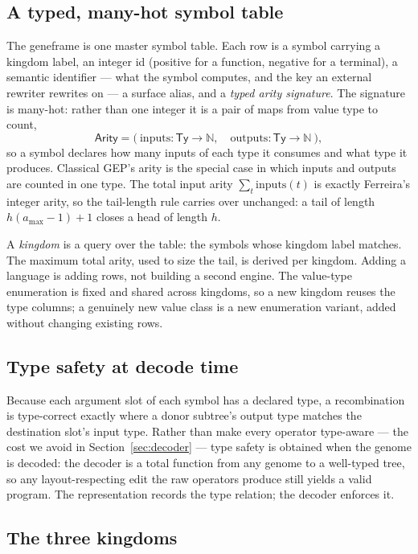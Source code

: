 \documentclass[sigconf,nonacm]{acmart}
\newcommand{\ty}[1]{\textsf{#1}}
\begin{document}
\subsection{A typed, many-hot symbol table}

The geneframe is one master symbol table. Each row is a symbol carrying a
kingdom label, an integer id (positive for a function, negative for a terminal),
a semantic identifier --- what the symbol computes, and the key an external
rewriter rewrites on --- a surface alias, and a \emph{typed arity signature}. The
signature is many-hot: rather than one integer it is a pair of maps from value
type to count,
\[
\ty{Arity} = \big(\ \mathrm{inputs}: \mathsf{Ty}\to\mathbb{N},\quad
\mathrm{outputs}: \mathsf{Ty}\to\mathbb{N}\ \big),
\]
so a symbol declares how many inputs of each type it consumes and what type it
produces. Classical GEP's arity is the special case in which inputs and outputs
are counted in one type. The total input arity $\sum_t \mathrm{inputs}(t)$ is
exactly Ferreira's integer arity, so the tail-length rule carries over
unchanged: a tail of length $h(a_{\max}-1)+1$ closes a head of length $h$.

A \emph{kingdom} is a query over the table: the symbols whose kingdom label
matches. The maximum total arity, used to size the tail, is derived per kingdom.
Adding a language is adding rows, not building a second engine. The value-type
enumeration is fixed and shared across kingdoms, so a new kingdom reuses the type
columns; a genuinely new value class is a new enumeration variant, added without
changing existing rows.

\subsection{Type safety at decode time}

Because each argument slot of each symbol has a declared type, a recombination
is type-correct exactly where a donor subtree's output type matches the
destination slot's input type. Rather than make every operator type-aware --- the
cost we avoid in Section~\ref{sec:decoder} --- type safety is obtained when the
genome is decoded: the decoder is a total function from any genome to a
well-typed tree, so any layout-respecting edit the raw operators produce still
yields a valid program. The representation records the type relation; the decoder
enforces it.

\subsection{The three kingdoms}
\end{document}
